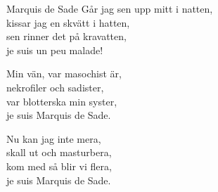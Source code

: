 \begin{song}{Marquis de Sade}
	\showversenumber
	Går jag sen upp mitt i natten,\\
	kissar jag en skvätt i hatten,\\
	sen rinner det på kravatten,\\
	je suis un peu malade!
	
	\showversenumber
	Min vän, var masochist är,\\
	nekrofiler och sadister,\\
	var blotterska min syster,\\
	je suis Marquis de Sade.
	
	\showversenumber
	Nu kan jag inte mera,\\
	skall ut och masturbera,\\
	kom med så blir vi flera,\\
	je suis Marquis de Sade.
	
\end{song}
